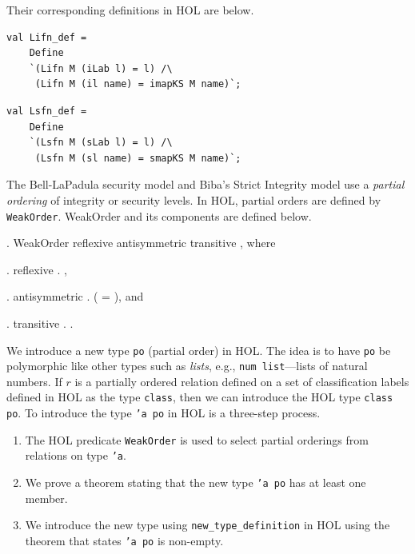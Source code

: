 \noindent{}Their corresponding definitions in HOL are below. 
\begin{session}
\begin{verbatim}
val Lifn_def =
    Define
    `(Lifn M (iLab l) = l) /\
     (Lifn M (il name) = imapKS M name)`;
\end{verbatim}
\end{session}

\begin{session}
\begin{verbatim}
val Lsfn_def =
    Define
    `(Lsfn M (sLab l) = l) /\
     (Lsfn M (sl name) = smapKS M name)`;
\end{verbatim}
\end{session}

The Bell-LaPadula security model and Biba's Strict Integrity model use
a \emph{partial ordering} of integrity or security levels. In HOL,
partial orders are defined by \texttt{WeakOrder}. WeakOrder and its
components are defined below.

\HOLTokenTurnstile{} \HOLTokenForall{}. WeakOrder
 \HOLTokenEquiv{} reflexive 
\HOLTokenConj{} antisymmetric \HOLBoundVar{Z} \HOLTokenConj{}
transitive \HOLBoundVar{Z}, where

\HOLTokenTurnstile{} \HOLTokenForall{}. reflexive
 \HOLTokenEquiv{}
\HOLTokenForall{}. \HOLBoundVar{R} \HOLBoundVar{x}
,

\HOLTokenTurnstile{} \HOLTokenForall{}. antisymmetric
 \HOLTokenEquiv{} \HOLTokenForall{}
. \HOLBoundVar{R}  
\HOLTokenConj{} \HOLBoundVar{R} \HOLBoundVar{y} \HOLBoundVar{x}
\HOLTokenImp{} (\HOLBoundVar{x} = ), and

\HOLTokenTurnstile{} \HOLTokenForall{}. transitive
 \HOLTokenEquiv{} \HOLTokenForall{}
 .  
\HOLBoundVar{y} \HOLTokenConj{} \HOLBoundVar{R} \HOLBoundVar{y}
\HOLBoundVar{z} \HOLTokenImp{} \HOLBoundVar{R} \HOLBoundVar{x}
\HOLBoundVar{z}.

We introduce a new type \texttt{po} (partial order) in HOL. The idea
is to have \texttt{po} be polymorphic like other types such as
\emph{lists}, e.g., \texttt{num list}---lists of natural numbers. If
$r$ is a partially ordered relation defined on a set of classification
labels defined in HOL as the type \texttt{class}, then we can
introduce the HOL type \texttt{class po}. To introduce the type
\texttt{'a po} in HOL is a three-step process.
\begin{enumerate}
\item The HOL predicate \texttt{WeakOrder} is used to select partial
  orderings from relations on type \texttt{'a}.
\item We prove a theorem stating that the new type \texttt{'a po} has
  at least one member.
\item We introduce the new type using \texttt{new\_type\_definition} in
  HOL using the theorem that states \texttt{'a po} is non-empty.
\end{enumerate}

